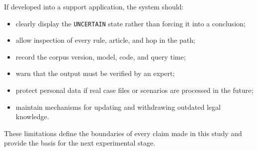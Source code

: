 If developed into a support application, the system should:

\begin{itemize}
    \item clearly display the \texttt{UNCERTAIN} state rather than forcing it
    into a conclusion;
    \item allow inspection of every rule, article, and hop in the path;
    \item record the corpus version, model, code, and query time;
    \item warn that the output must be verified by an expert;
    \item protect personal data if real case files or scenarios are processed
    in the future;
    \item maintain mechanisms for updating and withdrawing outdated legal
    knowledge.
\end{itemize}

These limitations define the boundaries of every claim made in this study
and provide the basis for the next experimental stage.
